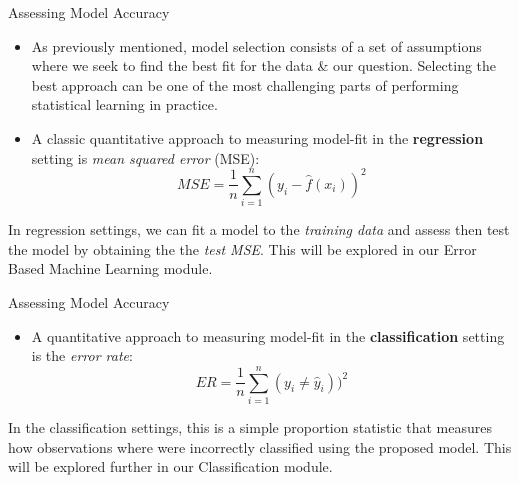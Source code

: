 \documentclass[aspectratio=169,xcolor=dvipsnames]{beamer}
\begin{document}
\begin{frame}{Assessing Model Accuracy}
\begin{itemize}
\setlength{\itemsep}{.25cm}
\item As previously mentioned, model selection consists of a set of assumptions where we seek to find the best fit for the data \& our question. Selecting the best approach can be one of the most challenging parts of performing statistical learning in practice.

\item A classic quantitative approach to measuring model-fit in the \textbf{regression} setting is \textit{mean squared error} (MSE):
$$MSE = \frac{1}{n}\sum^{n}_{i=1} (y_i - \hat{f}(x_i))^2$$
\end{itemize}
In regression settings, we can fit a model to the \textit{training data} and assess then test the model by obtaining the the \textit{test MSE}. This will be explored in our Error Based Machine Learning module.
\end{frame}


\begin{frame}{Assessing Model Accuracy}
\begin{itemize}
\setlength{\itemsep}{.25cm}

\item A quantitative approach to measuring model-fit in the \textbf{classification} setting is the \textit{error rate}:
$$ER = \frac{1}{n}\sum^{n}_{i=1} (y_i \neq \hat{y}_i))^2$$
\end{itemize}
In the classification settings, this is a simple proportion statistic that measures how observations where were incorrectly classified using the proposed model. This will be explored further in our Classification module. 
\end{frame}
\end{document}
